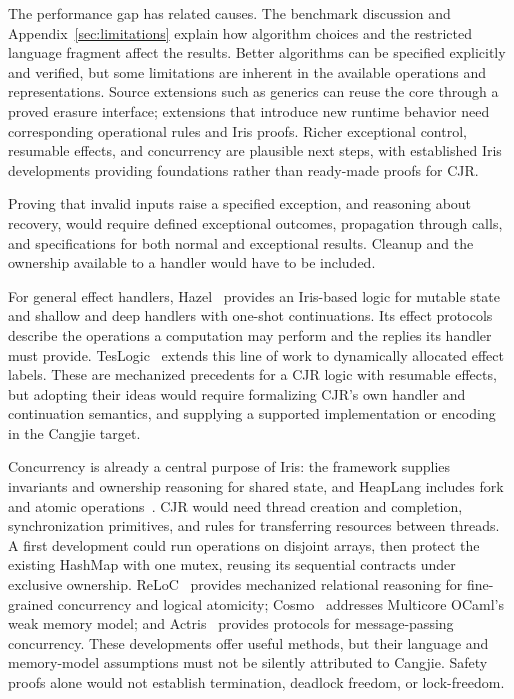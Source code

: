 \documentclass[11pt]{article}
\begin{document}
The performance gap has related causes. The benchmark discussion and Appendix~\ref{sec:limitations} explain how algorithm choices and the restricted language fragment affect the results. Better algorithms can be specified explicitly and verified, but some limitations are inherent in the available operations and representations. Source extensions such as generics can reuse the core through a proved erasure interface; extensions that introduce new runtime behavior need corresponding operational rules and Iris proofs. Richer exceptional control, resumable effects, and concurrency are plausible next steps, with established Iris developments providing foundations rather than ready-made proofs for CJR.

Proving that invalid inputs raise a specified exception, and reasoning about recovery, would require defined exceptional outcomes, propagation through calls, and specifications for both normal and exceptional results. Cleanup and the ownership available to a handler would have to be included.

For general effect handlers, Hazel~\cite{hazel-popl21} provides an Iris-based logic for mutable state and shallow and deep handlers with one-shot continuations. Its effect protocols describe the operations a computation may perform and the replies its handler must provide. TesLogic~\cite{teslogic-esop23} extends this line of work to dynamically allocated effect labels. These are mechanized precedents for a CJR logic with resumable effects, but adopting their ideas would require formalizing CJR's own handler and continuation semantics, and supplying a supported implementation or encoding in the Cangjie target.

Concurrency is already a central purpose of Iris: the framework supplies invariants and ownership reasoning for shared state, and HeapLang includes fork and atomic operations~\cite{iris-coq}. CJR would need thread creation and completion, synchronization primitives, and rules for transferring resources between threads. A first development could run operations on disjoint arrays, then protect the existing HashMap with one mutex, reusing its sequential contracts under exclusive ownership. ReLoC~\cite{reloc-lmcs21} provides mechanized relational reasoning for fine-grained concurrency and logical atomicity; Cosmo~\cite{cosmo-icfp20} addresses Multicore OCaml's weak memory model; and Actris~\cite{actris-lmcs22} provides protocols for message-passing concurrency. These developments offer useful methods, but their language and memory-model assumptions must not be silently attributed to Cangjie. Safety proofs alone would not establish termination, deadlock freedom, or lock-freedom.
\end{document}
